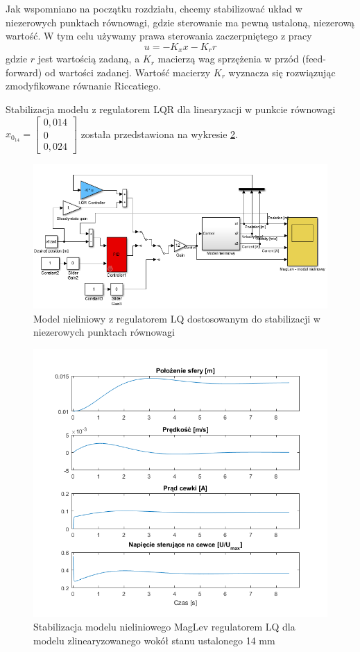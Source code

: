 Jak wspomniano na początku rozdziału, chcemy stabilizować układ w niezerowych punktach równowagi, gdzie sterowanie ma pewną ustaloną, niezerową wartość. W tym celu używamy prawa sterowania zaczerpniętego z pracy \cite{ReferenceTrackLQR}
\begin{equation}
u = -K_x x - K_r r
\end{equation}
gdzie $r$ jest wartością zadaną, a $K_r$ macierzą wag sprzężenia w przód (feed-forward) od wartości zadanej. Wartość macierzy $K_r$ wyznacza się rozwiązując zmodyfikowane równanie Riccatiego\cite{ReferenceTrackLQR}.

Stabilizacja modelu z regulatorem LQR dla linearyzacji w punkcie równowagi $ x_{0_{14}} = \begin{bmatrix} 0,014 \\
0 \\
0,024
\end{bmatrix}
$ została przedstawiona na wykresie \ref{img:model_LQR}.

\begin{figure}[!htb]
\centering
\includegraphics[scale=0.85]{img/model_nieliniowy_zLQR.PNG}
\caption{Model nieliniowy z regulatorem LQ dostosowanym do stabilizacji w niezerowych punktach równowagi}
\label{img:model_LQR}
\end{figure}

\begin{figure}[!htb]
\centering
\includegraphics[scale=0.85]{img/model_LQR_stabilizacja.png}
\caption{Stabilizacja modelu nieliniowego MagLev regulatorem LQ dla modelu zlinearyzowanego wokół stanu ustalonego 14 mm}
\label{img:model_LQR}
\end{figure}





